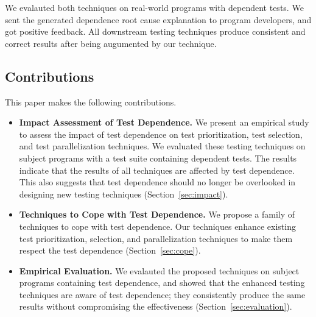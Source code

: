 We evalauted both techniques on real-world programs with dependent
tests. We sent the generated dependence root cause explanation
to program developers, and got positive feedback. All downstream
testing techniques produce consistent and correct results
after being augumented by our technique.

\subsection{Contributions}

This paper makes the following contributions.

\begin{itemize}

\item \textbf{Impact Assessment of Test Dependence.}
We present an empirical study to assess the impact of test dependence
on \prionum test prioritization, \selnum test selection, and \parnum
test parallelization techniques. We evaluated these 
testing techniques on \subjnum subject programs with a test suite containing
dependent tests. The results indicate that the results of
all techniques are affected by test dependence. This also
suggests that test dependence should no longer be overlooked
in designing new testing techniques (Section~\ref{sec:impact}).

\item \textbf{Techniques to Cope with Test Dependence.}
We propose a family of techniques to cope with test dependence.
Our techniques enhance existing test prioritization, selection,
and parallelization techniques to make them respect the test dependence
(Section~\ref{sec:cope}). 

\item \textbf{Empirical Evaluation.} We evalauted the proposed
techniques on \subjnum subject programs containing test dependence, and
showed that the enhanced testing techniques are aware of test dependence;
they consistently produce the same results without compromising
the effectiveness (Section~\ref{sec:evaluation}).

\end{itemize}

